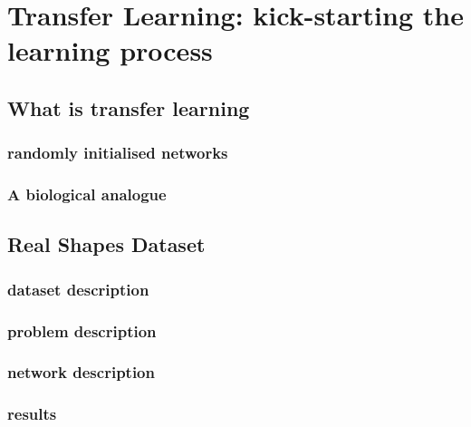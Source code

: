 
\chapter{Transfer Learning: kick-starting the learning process} %

\label{Chapter6} %


\section{What is transfer learning}
\subsection{randomly initialised networks}
\label{sec:random_init}

\subsection{A biological analogue}

\section{Real Shapes Dataset}
\subsection{dataset description}
\subsection{problem description}
\subsection{network description}
\subsection{results}

